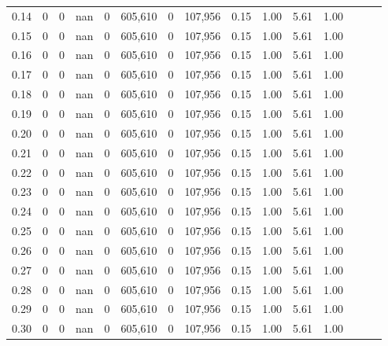 \begin{tabular}{rrrrrrrrrrrrrrr}
0.14 &        0 &       0 &   nan &        0 &  605,610 &        0 &  107,956 &  0.15 &  1.00 &  5.61 &      1.00 \\
0.15 &        0 &       0 &   nan &        0 &  605,610 &        0 &  107,956 &  0.15 &  1.00 &  5.61 &      1.00 \\
0.16 &        0 &       0 &   nan &        0 &  605,610 &        0 &  107,956 &  0.15 &  1.00 &  5.61 &      1.00 \\
0.17 &        0 &       0 &   nan &        0 &  605,610 &        0 &  107,956 &  0.15 &  1.00 &  5.61 &      1.00 \\
0.18 &        0 &       0 &   nan &        0 &  605,610 &        0 &  107,956 &  0.15 &  1.00 &  5.61 &      1.00 \\
0.19 &        0 &       0 &   nan &        0 &  605,610 &        0 &  107,956 &  0.15 &  1.00 &  5.61 &      1.00 \\
0.20 &        0 &       0 &   nan &        0 &  605,610 &        0 &  107,956 &  0.15 &  1.00 &  5.61 &      1.00 \\
0.21 &        0 &       0 &   nan &        0 &  605,610 &        0 &  107,956 &  0.15 &  1.00 &  5.61 &      1.00 \\
0.22 &        0 &       0 &   nan &        0 &  605,610 &        0 &  107,956 &  0.15 &  1.00 &  5.61 &      1.00 \\
0.23 &        0 &       0 &   nan &        0 &  605,610 &        0 &  107,956 &  0.15 &  1.00 &  5.61 &      1.00 \\
0.24 &        0 &       0 &   nan &        0 &  605,610 &        0 &  107,956 &  0.15 &  1.00 &  5.61 &      1.00 \\
0.25 &        0 &       0 &   nan &        0 &  605,610 &        0 &  107,956 &  0.15 &  1.00 &  5.61 &      1.00 \\
0.26 &        0 &       0 &   nan &        0 &  605,610 &        0 &  107,956 &  0.15 &  1.00 &  5.61 &      1.00 \\
0.27 &        0 &       0 &   nan &        0 &  605,610 &        0 &  107,956 &  0.15 &  1.00 &  5.61 &      1.00 \\
0.28 &        0 &       0 &   nan &        0 &  605,610 &        0 &  107,956 &  0.15 &  1.00 &  5.61 &      1.00 \\
0.29 &        0 &       0 &   nan &        0 &  605,610 &        0 &  107,956 &  0.15 &  1.00 &  5.61 &      1.00 \\
0.30 &        0 &       0 &   nan &        0 &  605,610 &        0 &  107,956 &  0.15 &  1.00 &  5.61 &      1.00 \\

\end{tabular}
